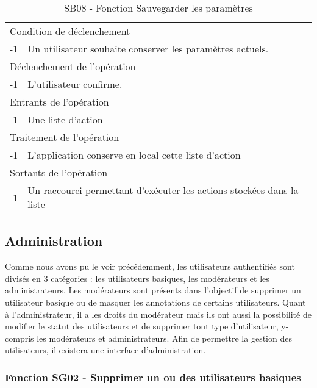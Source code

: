 \documentclass[a4paper]{article}
\begin{document}
\begin{table}[H]
  \centering
   \small
	\begin{tabular}{|c|p{12cm}|}
   		\hline
   			\rowcolor{lightgray}\multicolumn{2}{|c|}{\textbf{SB08 - Fonction Sauvegarder les paramètres}} \\
   		\hline
   			\multicolumn{2}{|l|}{Condition de d\'eclenchement} \\
   		\hline
   			-1 & Un utilisateur souhaite conserver les paramètres actuels. \\
   		\hline
   			\multicolumn{2}{|l|}{D\'eclenchement de l'op\'eration} \\
   		\hline
   			-1 & L'utilisateur confirme. \\
   		\hline
   			\multicolumn{2}{|l|}{Entrants de l'op\'eration} \\
   		\hline
        	-1 & Une liste d'action \\ 	
        \hline
   			\multicolumn{2}{|l|}{Traitement de l'op\'eration} \\
  		\hline
   			-1 & L'application conserve en local cette liste d'action \\
   		\hline
   			\multicolumn{2}{|l|}{Sortants de l'op\'eration} \\
   		\hline
   			-1 & Un raccourci permettant d'exécuter les actions stockées dans la liste \\
   		\hline
	\end{tabular}
  \caption{SB08 - Fonction Sauvegarder les paramètres}
  \normalsize
  \label{tab:visu_img_save_parameters}
\end{table}

\subsection{Administration}

Comme nous avons pu le voir précédemment, les utilisateurs authentifiés sont divisés en 3 catégories : les utilisateurs basiques, les modérateurs et les administrateurs. Les modérateurs sont présents dans l'objectif de supprimer un utilisateur basique ou de masquer les annotations de certains utilisateurs. Quant à l'administrateur, il a les droits du modérateur mais ils ont aussi la possibilité de modifier le statut des utilisateurs et de supprimer tout type d'utilisateur, y-compris les modérateurs et administrateurs. Afin de permettre la gestion des utilisateurs, il existera une interface d'administration.

\subsubsection{Fonction SG02 - Supprimer un ou des utilisateurs basiques}
\end{document}

